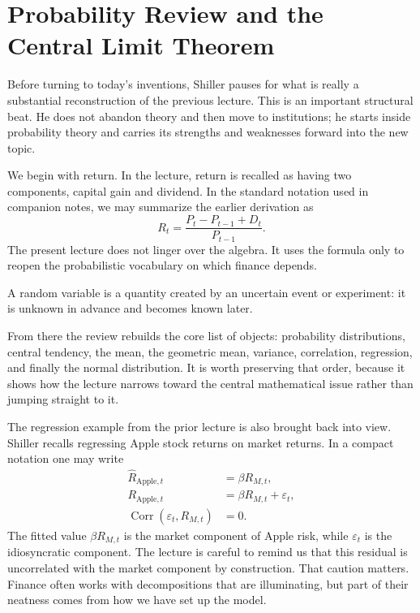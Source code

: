 \section{Probability Review and the Central Limit Theorem}

Before turning to today's inventions, Shiller pauses for what is really a substantial reconstruction of the previous lecture. This is an important structural beat. He does not abandon theory and then move to institutions; he starts inside probability theory and carries its strengths and weaknesses forward into the new topic.

We begin with return. In the lecture, return is recalled as having two components, capital gain and dividend. In the standard notation used in companion notes, we may summarize the earlier derivation as
\begin{equation}
R_t=\frac{P_t-P_{t-1}+D_t}{P_{t-1}}.
\end{equation}
The present lecture does not linger over the algebra. It uses the formula only to reopen the probabilistic vocabulary on which finance depends.

\begin{definition}
A random variable is a quantity created by an uncertain event or experiment: it is unknown in advance and becomes known later.
\end{definition}

From there the review rebuilds the core list of objects: probability distributions, central tendency, the mean, the geometric mean, variance, correlation, regression, and finally the normal distribution. It is worth preserving that order, because it shows how the lecture narrows toward the central mathematical issue rather than jumping straight to it.

The regression example from the prior lecture is also brought back into view. Shiller recalls regressing Apple stock returns on market returns. In a compact notation one may write
\begin{align}
\widehat R_{\text{Apple},t} &= \beta R_{M,t},\\
R_{\text{Apple},t} &= \beta R_{M,t}+\varepsilon_t,\\
\operatorname{Corr}(\varepsilon_t,R_{M,t})&=0.
\end{align}
The fitted value $\beta R_{M,t}$ is the market component of Apple risk, while $\varepsilon_t$ is the idiosyncratic component. The lecture is careful to remind us that this residual is uncorrelated with the market component by construction. That caution matters. Finance often works with decompositions that are illuminating, but part of their neatness comes from how we have set up the model.


